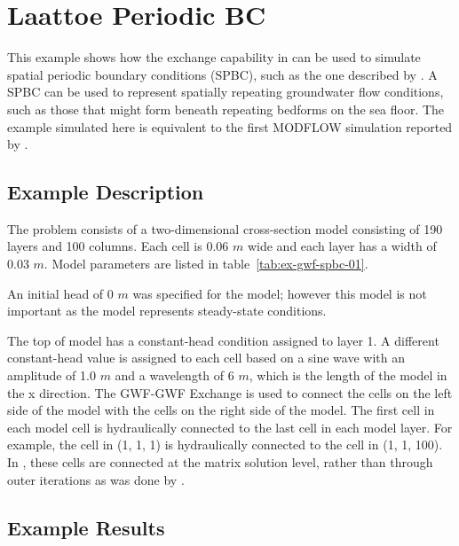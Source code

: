 \section{Laattoe Periodic BC}

This example shows how the exchange capability in \mf can be used to simulate spatial periodic boundary conditions (SPBC), such as the one described by \cite{laattoe2014spatial}.  A SPBC can be used to represent spatially repeating groundwater flow conditions, such as those that might form beneath repeating bedforms on the sea floor.  The example simulated here is equivalent to the first MODFLOW simulation reported by \cite{laattoe2014spatial}.  

\subsection{Example Description}

The problem consists of a two-dimensional cross-section model consisting of 190 layers and 100 columns.  Each cell is 0.06 $m$ wide and each layer has a width of 0.03 $m$.  Model parameters are listed in table~\ref{tab:ex-gwf-spbc-01}. 



An initial head of 0 $m$ was specified for the model; however this model is not important as the model represents steady-state conditions.

The top of model has a constant-head condition assigned to layer 1.  A different constant-head value is assigned to each cell based on a sine wave with an amplitude of 1.0 $m$ and a wavelength of 6 $m$, which is the length of the model in the x direction.  The GWF-GWF Exchange is used to connect the cells on the left side of the model with the cells on the right side of the model.  The first cell in each model cell is hydraulically connected to the last cell in each model layer.  For example, the cell in (1, 1, 1) is hydraulically connected to the cell in (1, 1, 100).  In \mf, these cells are connected at the matrix solution level, rather than through outer iterations as was done by \cite{laattoe2014spatial}.  

\subsection{Example Results}

